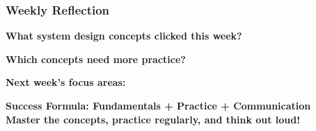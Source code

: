 \documentclass[10pt,a4paper]{article}
\begin{document}
\subsubsection{Weekly Reflection}

\textbf{What system design concepts clicked this week?}\\

\textbf{Which concepts need more practice?}\\

\textbf{Next week's focus areas:}\\

\vspace{1cm}
\begin{center}
\textbf{\Large Success Formula: Fundamentals + Practice + Communication}\\
\textbf{\Large Master the concepts, practice regularly, and think out loud!}
\end{center}
\end{document}
